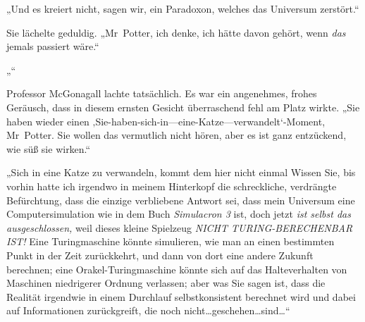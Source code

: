 „Und es kreiert nicht, sagen wir, ein Paradoxon, welches das Universum zerstört.“

Sie lächelte geduldig. „Mr~Potter, ich denke, ich hätte davon gehört, wenn \emph{das} jemals passiert wäre.“

„“

Professor McGonagall lachte tatsächlich. Es war ein angenehmes, frohes Geräusch, dass in diesem ernsten Gesicht überraschend fehl am Platz wirkte. „Sie haben wieder einen ‚Sie-haben-sich-in—eine-Katze—verwandelt‘-Moment, Mr~Potter. Sie wollen das vermutlich nicht hören, aber es ist ganz entzückend, wie süß sie wirken.“

„Sich in eine Katze zu verwandeln, kommt dem hier nicht einmal  Wissen Sie, bis vorhin hatte ich irgendwo in meinem Hinterkopf die schreckliche, verdrängte Befürchtung, dass die einzige verbliebene Antwort sei, dass mein Universum eine Computersimulation wie in dem Buch \emph{Simulacron 3} ist, doch jetzt \emph{ist selbst das ausgeschlossen,} weil dieses kleine Spielzeug \emph{NICHT TURING-BERECHENBAR IST!} Eine Turingmaschine könnte simulieren, wie man an einen bestimmten Punkt in der Zeit zurückkehrt, und dann von dort eine andere Zukunft berechnen; eine Orakel-Turingmaschine könnte sich auf das Halteverhalten von Maschinen niedrigerer Ordnung verlassen; aber was Sie sagen ist, dass die Realität irgendwie in einem Durchlauf selbstkonsistent berechnet wird und dabei auf Informationen zurückgreift, die noch nicht…geschehen…sind…“


